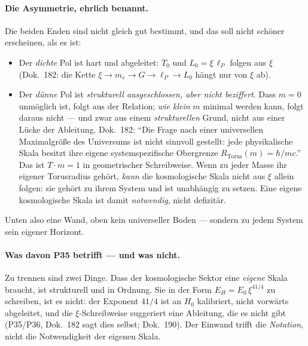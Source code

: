 \paragraph{Die Asymmetrie, ehrlich benannt.} Die beiden Enden sind nicht gleich gut bestimmt, und
das soll nicht schöner erscheinen, als es ist:
\begin{itemize}
\item Der \emph{dichte} Pol ist hart und abgeleitet: $T_0$ und $L_0=\xi\,\ell_P$ folgen aus $\xi$
(Dok.~182: die Kette $\xi \to m_e \to G \to \ell_P \to L_0$ hängt nur von $\xi$ ab).
\item Der \emph{dünne} Pol ist \emph{strukturell ausgeschlossen, aber nicht beziffert}. Dass
$m=0$ unmöglich ist, folgt aus der Relation; \emph{wie klein} $m$ minimal werden kann, folgt daraus
nicht --- und zwar aus einem \emph{strukturellen} Grund, nicht aus einer Lücke der Ableitung.
Dok.~182: \enquote{Die Frage nach einer universellen Maximalgröße des Universums ist nicht sinnvoll
gestellt: jede physikalische Skala besitzt ihre eigene systemspezifische Obergrenze
$R_\text{Torus}(m) = \hbar/mc$.} Das ist $T\cdot m = 1$ in geometrischer Schreibweise. Wenn zu jeder
Masse ihr eigener Torusradius gehört, \emph{kann} die kosmologische Skala nicht aus $\xi$ allein
folgen: sie gehört zu ihrem System und ist unabhängig zu setzen. Eine eigene kosmologische Skala
ist damit \emph{notwendig}, nicht defizitär.
\end{itemize}
Unten also eine Wand, oben kein universeller Boden --- sondern zu jedem System sein eigener
Horizont.

\paragraph{Was davon P35 betrifft --- und was nicht.} Zu trennen sind zwei Dinge. Dass der
kosmologische Sektor eine \emph{eigene} Skala braucht, ist strukturell und in Ordnung. Sie in der
Form $E_H = E_0\,\xi^{41/4}$ zu schreiben, ist es nicht: der Exponent $41/4$ ist an $H_0$
kalibriert, nicht vorwärts abgeleitet, und die $\xi$-Schreibweise suggeriert eine Ableitung, die es
nicht gibt (P35/P36, Dok.~182 sagt dies selbst; Dok.~190). Der Einwand trifft die \emph{Notation},
nicht die Notwendigkeit der eigenen Skala.


